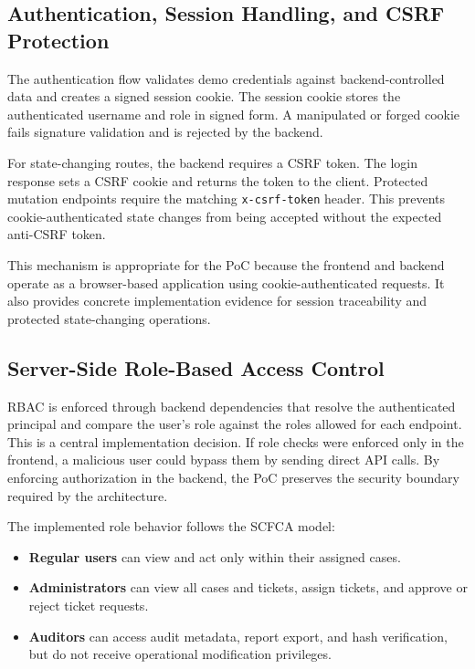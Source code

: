 \documentclass[12pt,a4paper]{report}
\begin{document}
\subsection{Authentication, Session Handling, and CSRF Protection}

The authentication flow validates demo credentials against backend-controlled data and creates a signed session cookie. The session cookie stores the authenticated username and role in signed form. A manipulated or forged cookie fails signature validation and is rejected by the backend.

For state-changing routes, the backend requires a CSRF token. The login response sets a CSRF cookie and returns the token to the client. Protected mutation endpoints require the matching \texttt{x-csrf-token} header. This prevents cookie-authenticated state changes from being accepted without the expected anti-CSRF token.

This mechanism is appropriate for the PoC because the frontend and backend operate as a browser-based application using cookie-authenticated requests. It also provides concrete implementation evidence for session traceability and protected state-changing operations.

\subsection{Server-Side Role-Based Access Control}

RBAC is enforced through backend dependencies that resolve the authenticated principal and compare the user's role against the roles allowed for each endpoint. This is a central implementation decision. If role checks were enforced only in the frontend, a malicious user could bypass them by sending direct API calls. By enforcing authorization in the backend, the PoC preserves the security boundary required by the architecture.

The implemented role behavior follows the SCFCA model:

\begin{itemize}
    \item \textbf{Regular users} can view and act only within their assigned cases.
    \item \textbf{Administrators} can view all cases and tickets, assign tickets, and approve or reject ticket requests.
    \item \textbf{Auditors} can access audit metadata, report export, and hash verification, but do not receive operational modification privileges.
\end{itemize}
\end{document}
